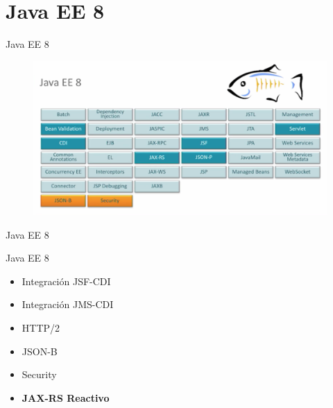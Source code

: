 \documentclass{beamer}
\begin{document}
\section{Java EE 8}
\begin{frame}{Java EE 8}
\begin{figure}
	\centering
	\includegraphics[width=\linewidth]{Images/javaee8}
\end{figure}
\end{frame}

\begin{frame}{Java EE 8}
\begin{alertblock}{Java EE 8}
\begin{itemize}
	\item Integración JSF-CDI
	\item Integración JMS-CDI
	\item HTTP/2
	\item JSON-B
	\item Security
	\item \textbf{JAX-RS Reactivo}
\end{itemize}
\end{alertblock}
\end{frame}
\end{document}
